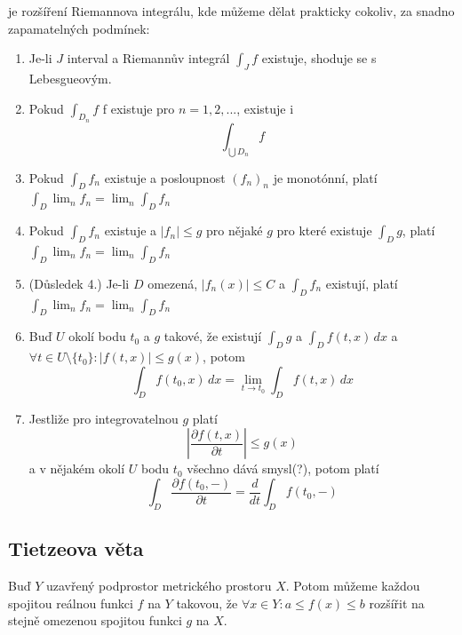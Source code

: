 \documentclass[../main.tex]{subfiles}
\begin{document}
\begin{definitionnodot}
	je rozšíření Riemannova integrálu, kde můžeme dělat prakticky cokoliv,
	za snadno zapamatelných podmínek:
	\begin{enumerate}
	    \item Je-li $J$ interval a Riemannův integrál $\int_{J} f$ existuje, shoduje se s Lebesgueovým.
	    \item Pokud $ \int_{D_n} f $ f existuje pro $n = 1, 2, ...$, existuje i \[\int_{\bigcup D_n} f\]
	    \item Pokud $ \int_{D} f_n $ existuje a posloupnost $(f_n)_n$ je monotónní, platí
	    \( \int_D \lim_n f_n = \lim_n \int_D f_n \)
	    \item Pokud $\int_D f_n$ existuje a $|f_n|\leq g$ pro nějaké $g$ pro které existuje
	    $\int_D g$, platí
	    \( \int_D \lim_n f_n = \lim_n \int_D f_n \)
	    \item (Důsledek 4.) Je-li $D$ omezená, $|f_n(x)| \leq C$ a $\int_D f_n$ existují, platí
	    \( \int_D \lim_n f_n = \lim_n \int_D f_n \)
	    \item Buď $U$ okolí bodu $t_0$ a $g$ takové, že existují $\int_D g$ a $\int_D f(t,x)\,dx$ a
	    $\forall t \in U\textrm{\textbackslash}\{t_0\}: |f(t,x)|\leq g(x)$, potom
	    \[ \int_D f(t_0, x)\,dx = \lim_{t\to t_0} \int_D f(t,x)\,dx \]
	    \item Jestliže pro integrovatelnou $g$ platí
	    \[ \left| \frac{\partial f(t,x)}{\partial t} \right| \leq g(x) \]
	    a v nějakém okolí $U$ bodu $t_0$ všechno dává smysl(?), potom platí
	    \[ \int_D \frac{\partial f(t_0,-)}{\partial t} = \frac{d}{dt} \int_D f(t_0, -)\]
	\end{enumerate}
\end{definitionnodot}


\subsection{Tietzeova věta}
\begin{theorem}
	Buď $Y$ uzavřený podprostor metrického prostoru $X$. Potom můžeme každou spojitou reálnou
	funkci $f$ na $Y$ takovou, že $\forall x \in Y: a \leq f(x) \leq b$ rozšířit na stejně omezenou
	spojitou funkci $g$ na $X$.
\end{theorem}
\end{document}

